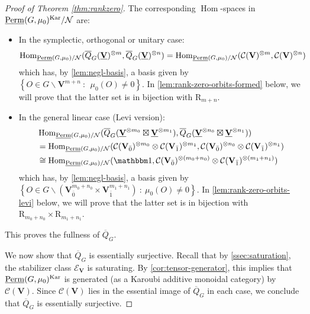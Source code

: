 \documentclass[11pt,a4paper]{amsart}
\theoremstyle{plain}%
\theoremstyle{definition}
\theoremstyle{remark}
\newcommand{\Hom}{\operatorname{Hom}}
\newcommand{\triv}{{\mathbbm 1}}
\newcommand{\V}{\mathbf{V}}
\newcommand{\Perm}{\underline{{\rm Perm}}}
\newcommand{\Kar}{\mathrm{Kar}}
\newcommand{\N}{\mathcal N}
\newcommand{\cC}{\mathcal{C}}
\begin{document}
\begin{proof}[Proof of Theorem \ref{thm:rankzero}]
The corresponding $\Hom$-spaces in $ \Perm(G, \mu_0)^{\Kar}/\N$ are:
\begin{itemize}[itemindent=0pt,leftmargin=*]
    \item In the symplectic, orthogonal or unitary case:
   \begin{align*}
       \Hom_{ \Perm(G, \mu_0)/\N}(\overline{Q}_G(\underline{\V})^{\otimes m},\overline{Q}_G(\underline{\V})^{\otimes n}) &= \Hom_{ \Perm(G, \mu_0)/\N}(\cC(\V)^{\otimes m},\cC(\V)^{\otimes n})
   \end{align*}
   which has, by \cref{lem:negl-basis}, a basis given by $\left\{O\in  G\backslash\V^{m+n} ~:~~\mu_0(O)\neq 0\right\}.$
   In \cref{lem:rank-zero-orbits-formed} below, we will prove that the latter set is in bijection with $\mathrm{R}_{m+n}$.
       \item In the general linear case (Levi version):
   \begin{align*}
       &\Hom_{ \Perm(G, \mu_0)/\N}(\overline{Q}_G(\underline{\V}^{\otimes m_0}\boxtimes\underline{\V}^{\otimes m_1}),\overline{Q}_G(\underline{\V}^{\otimes n_0} \boxtimes \underline{\V}^{\otimes n_1})) \\
       &= \Hom_{ \Perm(G, \mu_0)/\N}(\cC(\V_{\bar 0})^{\otimes m_0}\otimes \cC(\V_{\bar 1})^{\otimes m_1},\cC(\V_{\bar 0})^{\otimes n_0}\otimes \cC(\V_{\bar 1})^{\otimes n_1})\\
       &\cong  {\Hom_{ \Perm(G, \mu_0)/\N}(\triv,\cC(\V_{\bar 0})^{\otimes (m_0+n_0)}\otimes\cC(\V_{\bar 1})^{\otimes (m_1+ n_1)})}
   \end{align*}
   which has, by \cref{lem:negl-basis}, a basis given by $\left\{O\in G\backslash( \V_{\bar 0}^{m_0+n_0}\times \V_{\bar 1}^{m_1+n_1} )~:~\mu_0(O)\neq 0\right\}.$
   In \cref{lem:rank-zero-orbits-levi} below, we will prove that the latter set is in bijection with $\mathrm{R}_{m_0+n_0}\times \mathrm{R}_{m_1+n_1}$.
\end{itemize}
This proves the fullness of $\overline{Q}_G$. 

We now show that $\overline{Q}_G$ is essentially surjective. 
Recall that by \cref{ssec:saturation}, the stabilizer class $\mathcal{E}_{\V}$ is saturating. By \cref{cor:tensor-generator}, this implies that $\Perm(G, \mu_0)^{\Kar}$ is generated (as a Karoubi additive monoidal category) by $\cC(\V)$. Since $\cC(\V)$ lies in the essential image of $\overline{Q}_G$ in each case, we conclude that $\overline{Q}_G$ is essentially surjective.



\end{proof}
\end{document}
